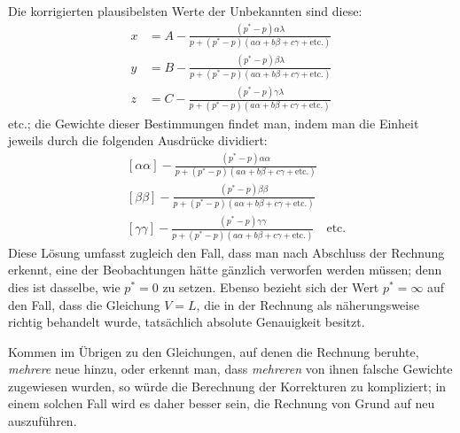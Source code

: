 %
Die korrigierten plausibelsten Werte der Unbekannten sind diese:
\[
\begin{aligned}
x&=A-\frac{(p^*-p)\alpha\lambda}{p+(p^*-p)(a\alpha+b\beta+c\gamma+\text{etc.})}\\[7pt]
y&=B-\frac{(p^*-p)\beta\lambda}{p+(p^*-p)(a\alpha+b\beta+c\gamma+\text{etc.})}\\[7pt]
z&=C-\frac{(p^*-p)\gamma\lambda}{p+(p^*-p)(a\alpha+b\beta+c\gamma+\text{etc.})}
\end{aligned}
\]
etc.; die Gewichte dieser Bestimmungen findet man, indem man die Einheit jeweils durch die folgenden Ausdrücke dividiert:
\[
\begin{aligned}
&[\alpha\alpha]-\frac{(p^*-p)\alpha\alpha}{p+(p^*-p)(a\alpha+b\beta+c\gamma+\text{etc.})}\\[7pt]
&[\beta\beta]-\frac{(p^*-p)\beta\beta}{p+(p^*-p)(a\alpha+b\beta+c\gamma+\text{etc.})}\\[7pt]
&[\gamma\gamma]-\frac{(p^*-p)\gamma\gamma}{p+(p^*-p)(a\alpha+b\beta+c\gamma+\text{etc.})}\quad\text{etc.}
\end{aligned}
\]
Diese Lösung umfasst zugleich den Fall, dass man nach Abschluss der Rechnung erkennt, eine der Beobachtungen hätte gänzlich verworfen werden müssen; denn dies ist dasselbe, wie \(p^*=0\) zu setzen. Ebenso bezieht sich der Wert \(p^*=\infty\) auf den Fall, dass die Gleichung \(V=L\), die in der Rechnung als näherungsweise richtig behandelt wurde, tatsächlich absolute Genauigkeit besitzt.

Kommen im Übrigen zu den Gleichungen, auf denen die Rechnung beruhte, \textit{mehrere} neue hinzu, oder erkennt man, dass \textit{mehreren} von ihnen falsche Gewichte zugewiesen wurden, so würde die Berechnung der Korrekturen zu kompliziert; in einem solchen Fall wird es daher besser sein, die Rechnung von Grund auf neu auszuführen.

\clearpage
